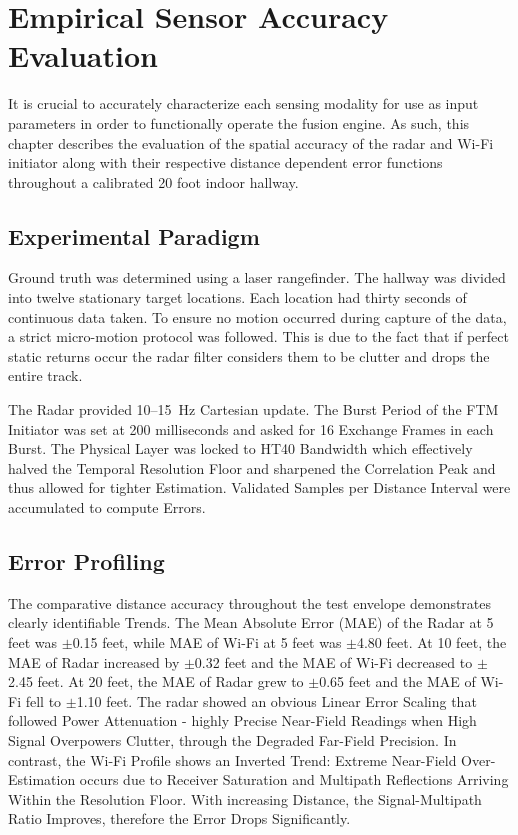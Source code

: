 \chapter{Empirical Sensor Accuracy Evaluation}
\label{chap:evaluation}

It is crucial to accurately characterize each sensing modality for use as input parameters in order to functionally operate the fusion engine. As such, this chapter describes the evaluation of the spatial accuracy of the radar and Wi-Fi initiator along with their respective distance dependent error functions throughout a calibrated 20 foot indoor hallway.

\section{Experimental Paradigm}
\label{sec:paradigm}

Ground truth was determined using a laser rangefinder. The hallway was divided into twelve stationary target locations. Each location had thirty seconds of continuous data taken. To ensure no motion occurred during capture of the data, a strict micro-motion protocol was followed. This is due to the fact that if perfect static returns occur the radar filter considers them to be clutter and drops the entire track.

The Radar provided 10--15~Hz Cartesian update. The Burst Period of the FTM Initiator was set at 200 milliseconds and asked for 16 Exchange Frames in each Burst. The Physical Layer was locked to HT40 Bandwidth which effectively halved the Temporal Resolution Floor and sharpened the Correlation Peak and thus allowed for tighter Estimation. Validated Samples per Distance Interval were accumulated to compute Errors.

\section{Error Profiling}
\label{sec:errorprofiling}

The comparative distance accuracy throughout the test envelope demonstrates clearly identifiable Trends. The Mean Absolute Error (MAE) of the Radar at 5 feet was $\pm$0.15 feet, while MAE of Wi-Fi at 5 feet was $\pm$4.80 feet. At 10 feet, the MAE of Radar increased by $\pm$0.32 feet and the MAE of Wi-Fi decreased to $\pm$2.45 feet. At 20 feet, the MAE of Radar grew to $\pm$0.65 feet and the MAE of Wi-Fi fell to $\pm$1.10 feet. The radar showed an obvious Linear Error Scaling that followed Power Attenuation - highly Precise Near-Field Readings when High Signal Overpowers Clutter, through the Degraded Far-Field Precision. In contrast, the Wi-Fi Profile shows an Inverted Trend: Extreme Near-Field Over-Estimation occurs due to Receiver Saturation and Multipath Reflections Arriving Within the Resolution Floor. With increasing Distance, the Signal-Multipath Ratio Improves, therefore the Error Drops Significantly.

